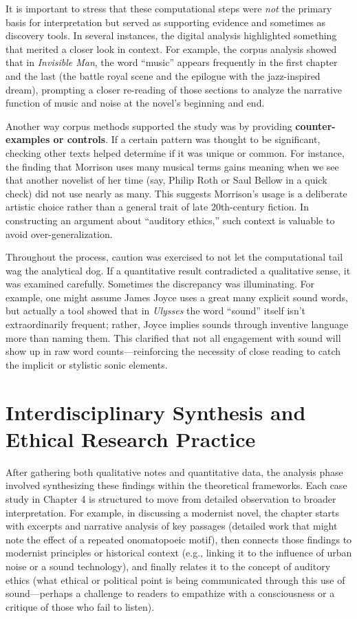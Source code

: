 \documentclass[12pt]{report}
\begin{document}
It is important to stress that these computational steps were \textit{not} the primary basis for interpretation but served as supporting evidence and sometimes as discovery tools. In several instances, the digital analysis highlighted something that merited a closer look in context. For example, the corpus analysis showed that in \textit{Invisible Man}, the word “music” appears frequently in the first chapter and the last (the battle royal scene and the epilogue with the jazz-inspired dream), prompting a closer re-reading of those sections to analyze the narrative function of music and noise at the novel’s beginning and end.

Another way corpus methods supported the study was by providing \textbf{counter-examples or controls}. If a certain pattern was thought to be significant, checking other texts helped determine if it was unique or common. For instance, the finding that Morrison uses many musical terms gains meaning when we see that another novelist of her time (say, Philip Roth or Saul Bellow in a quick check) did not use nearly as many. This suggests Morrison’s usage is a deliberate artistic choice rather than a general trait of late 20th-century fiction. In constructing an argument about “auditory ethics,” such context is valuable to avoid over-generalization.

Throughout the process, caution was exercised to not let the computational tail wag the analytical dog. If a quantitative result contradicted a qualitative sense, it was examined carefully. Sometimes the discrepancy was illuminating. For example, one might assume James Joyce uses a great many explicit sound words, but actually a tool showed that in \textit{Ulysses} the word “sound” itself isn’t extraordinarily frequent; rather, Joyce implies sounds through inventive language more than naming them. This clarified that not all engagement with sound will show up in raw word counts—reinforcing the necessity of close reading to catch the implicit or stylistic sonic elements.

\section{Interdisciplinary Synthesis and Ethical Research Practice}
After gathering both qualitative notes and quantitative data, the analysis phase involved synthesizing these findings within the theoretical frameworks. Each case study in Chapter 4 is structured to move from detailed observation to broader interpretation. For example, in discussing a modernist novel, the chapter starts with excerpts and narrative analysis of key passages (detailed work that might note the effect of a repeated onomatopoeic motif), then connects those findings to modernist principles or historical context (e.g., linking it to the influence of urban noise or a sound technology), and finally relates it to the concept of auditory ethics (what ethical or political point is being communicated through this use of sound—perhaps a challenge to readers to empathize with a consciousness or a critique of those who fail to listen).
\end{document}

